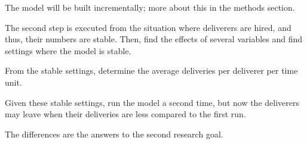 The model will be built incrementally; more about this in the methods section.

The second step is executed from the situation where deliverers are hired, and thus, their numbers are stable.
Then, find the effects of several variables and find settings where the model is stable.

From the stable settings, determine the average deliveries per deliverer per time unit.

Given these stable settings, run the model a second time, but now the deliverers may leave when their deliveries are less
compared to the first run.

The differences are the answers to the second research goal.


